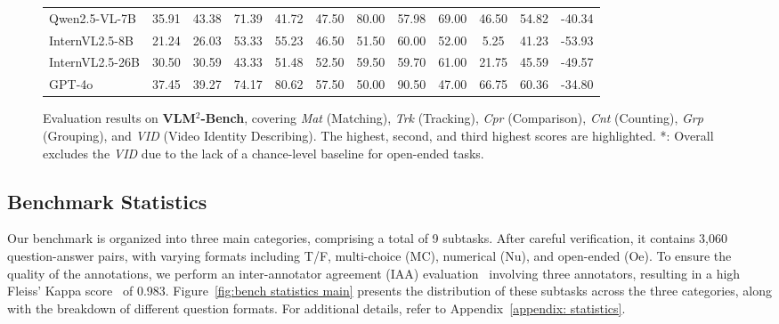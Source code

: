 \begin{figure*}[t]
\begin{minipage}{0.99\textwidth}
{\begin{tabular}{l||cc|ccc|cccc|cc}
            Qwen2.5-VL-7B & \cellcolor{yellow!45}35.91 & \cellcolor{yellow!75}43.38 & \cellcolor{yellow!45}71.39 & 41.72 & \cellcolor{yellow!15}47.50 & \cellcolor{yellow!75}80.00 & 57.98 & \cellcolor{yellow!75}69.00 & 46.50 & \cellcolor{yellow!45}54.82 & -40.34 \\
            InternVL2.5-8B        & 21.24 & 26.03 & 53.33 & 55.23 & 46.50 & 51.50 & \cellcolor{yellow!15}60.00 & \cellcolor{yellow!15}52.00 & 5.25  & 41.23 & -53.93 \\
            InternVL2.5-26B        & \cellcolor{yellow!15}30.50 & \cellcolor{yellow!15}30.59 & 43.33 & 51.48 & \cellcolor{yellow!45}52.50 & 59.50 & 59.70 & \cellcolor{yellow!45}61.00 & 21.75 & \cellcolor{yellow!15}45.59 & -49.57 \\
            \midrule
            GPT-4o                & \cellcolor{yellow!75}37.45 & \cellcolor{yellow!45}39.27 & \cellcolor{yellow!75}74.17 & \cellcolor{yellow!75}80.62 & \cellcolor{yellow!75}57.50 & 50.00 & \cellcolor{yellow!75}90.50 & 47.00 & \cellcolor{yellow!75}66.75 & \cellcolor{yellow!75}60.36 & -34.80 \\
            \bottomrule
        \end{tabular}
        }
    \end{minipage}
    \caption{Evaluation results on \textbf{VLM$^2$-Bench}, covering \textit{Mat} (Matching), \textit{Trk} (Tracking), \textit{Cpr} (Comparison), \textit{Cnt} (Counting), \textit{Grp} (Grouping), and \textit{VID} (Video Identity Describing). The \colorbox{yellow!75}{highest}, \colorbox{yellow!45}{second}, and \colorbox{yellow!15}{third} highest scores are highlighted. *: Overall excludes the \textit{VID} due to the lack of a chance-level baseline for open-ended tasks.}
    \label{exp:main_exp}
\end{figure*}

\subsection{Benchmark Statistics}
\label{bench_statistics_main}
Our benchmark is organized into three main categories, comprising a total of 9 subtasks. After careful verification, it contains 3,060 question-answer pairs, with varying formats including T/F, multi-choice (MC), numerical (Nu), and open-ended (Oe). To ensure the quality of the annotations, we perform an inter-annotator agreement (IAA) evaluation~\citep{thorne2018fever} involving three annotators, resulting in a high Fleiss' Kappa score~\citep{fleiss1971measuring} of 0.983. Figure~\ref{fig:bench statistics main} presents the distribution of these subtasks across the three categories, along with the breakdown of different question formats. For additional details, refer to Appendix~\ref{appendix: statistics}.


